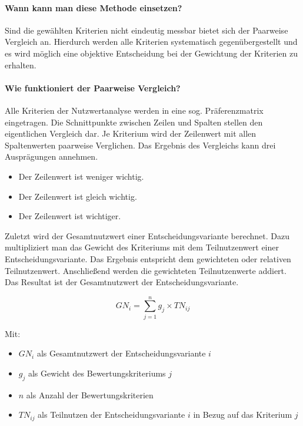 \paragraph{Wann kann man diese Methode einsetzen?}
Sind die gewählten Kriterien nicht eindeutig messbar bietet sich der Paarweise Vergleich an. Hierdurch werden alle Kriterien systematisch gegenübergestellt und es wird möglich eine objektive Entscheidung bei der Gewichtung der Kriterien zu erhalten. 

\paragraph{Wie funktioniert der Paarweise Vergleich?}
Alle Kriterien der Nutzwertanalyse werden in eine sog. Präferenzmatrix eingetragen. Die Schnittpunkte zwischen Zeilen und Spalten stellen den eigentlichen Vergleich dar. Je Kriterium wird der Zeilenwert mit allen Spaltenwerten paarweise Verglichen. Das Ergebnis des Vergleichs kann drei Ausprägungen annehmen.

\begin{itemize}
	\item Der Zeilenwert ist weniger wichtig.
	\item Der Zeilenwert ist gleich wichtig.
	\item Der Zeilenwert ist wichtiger.
\end{itemize}

Zuletzt wird der Gesamtnutzwert einer Entscheidungsvariante berechnet. Dazu multipliziert man das Gewicht des Kriteriums mit dem Teilnutzenwert einer Entscheidungsvariante. Das Ergebnis entspricht dem gewichteten oder relativen Teilnutzenwert. Anschließend werden die gewichteten Teilnutzenwerte addiert. Das Resultat ist der Gesamtnutzwert der Entscheidungsvariante.

\begin{equation}
	\label{eq:nutzwertanalyse}
	GN_{i} = \sum_{j=1}^{n} g_{j} \times TN_{ij}	
\end{equation}

Mit:

\begin{itemize}
	\item $GN_{i}$ als Gesamtnutzwert der Entscheidungsvariante $i$
	\item $g_{j}$ als Gewicht des Bewertungskriteriums $j$
	\item $n$ als Anzahl der Bewertungskriterien
	\item $TN_{ij}$ als Teilnutzen der Entscheidungsvariante $i$ in Bezug auf das Kriterium $j$
\end{itemize}


